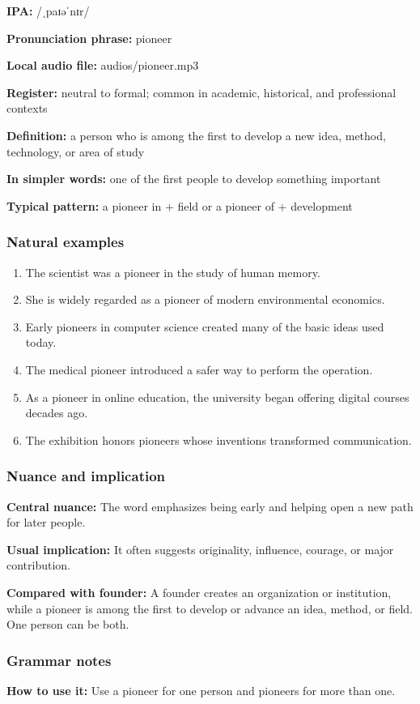 \documentclass[11pt]{article}
\begin{document}
\textbf{IPA:} /ˌpaɪəˈnɪr/

\textbf{Pronunciation phrase:} pioneer

\textbf{Local audio file:} audios/pioneer.mp3

\textbf{Register:} neutral to formal; common in academic, historical, and professional contexts

\textbf{Definition:} a person who is among the first to develop a new idea, method, technology, or area of study

\textbf{In simpler words:} one of the first people to develop something important

\textbf{Typical pattern:} a pioneer in + field or a pioneer of + development

\subsubsection{Natural examples}
\begin{enumerate}
  \item The scientist was a pioneer in the study of human memory.
  \item She is widely regarded as a pioneer of modern environmental economics.
  \item Early pioneers in computer science created many of the basic ideas used today.
  \item The medical pioneer introduced a safer way to perform the operation.
  \item As a pioneer in online education, the university began offering digital courses decades ago.
  \item The exhibition honors pioneers whose inventions transformed communication.
\end{enumerate}

\subsubsection{Nuance and implication}
\textbf{Central nuance:} The word emphasizes being early and helping open a new path for later people.

\textbf{Usual implication:} It often suggests originality, influence, courage, or major contribution.

\textbf{Compared with founder:} A founder creates an organization or institution, while a pioneer is among the first to develop or advance an idea, method, or field. One person can be both.

\subsubsection{Grammar notes}
\textbf{How to use it:} Use a pioneer for one person and pioneers for more than one.
\end{document}
